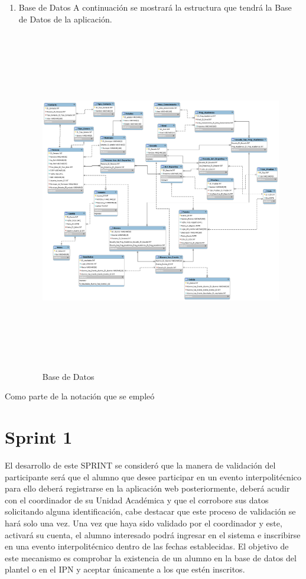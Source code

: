 	\begin{enumerate}
		\item Base de Datos
		A continuación se mostrará la estructura que tendrá la Base de Datos de la aplicación.
		\begin{figure}[hbt!]
			\centering
			\includegraphics[width=22cm, height=15cm, angle=90]{Imagenes/BasedeDatos.png}
			\caption{Base de Datos}
		\end{figure}
	\end{enumerate}
	\pagebreak
	
	Como parte de la notación que se empleó 
	
	\section{Sprint 1}
	\noindent El desarrollo de este SPRINT se consideró que la manera de validación del participante será que el alumno que desee participar en un evento interpolitécnico para ello deberá registrarse en la aplicación web posteriormente, deberá acudir con el coordinador de su Unidad Académica y que el corrobore sus datos solicitando alguna identificación, cabe destacar que este proceso de validación se hará solo una vez.
	Una vez que haya sido validado por el coordinador y este, activará su cuenta, el alumno interesado podrá ingresar en el sistema e inscribirse en una evento interpolitécnico dentro de las fechas establecidas.
	El objetivo de este mecanismo es comprobar la existencia de un alumno en la base de datos del plantel o en el IPN y aceptar únicamente a los que estén inscritos.
	
